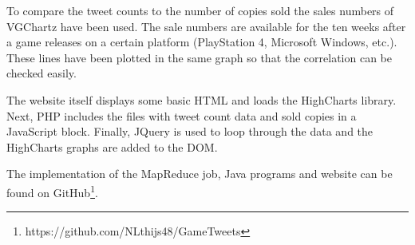 To compare the tweet counts to the number of copies sold the sales numbers of VGChartz have been used. The sale numbers are available for the ten weeks after a game releases on a certain platform (PlayStation 4, Microsoft Windows, etc.). These lines have been plotted in the same graph so that the correlation can be checked easily.

The website itself displays some basic HTML and loads the HighCharts library. Next, PHP includes the files with tweet count data and sold copies in a JavaScript block. Finally, JQuery is used to loop through the data and the HighCharts graphs are added to the DOM.

The implementation of the MapReduce job, Java programs and website can be found on GitHub\footnote{https://github.com/NLthijs48/GameTweets}.